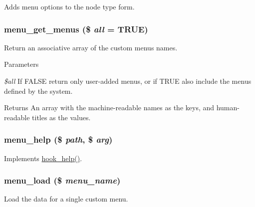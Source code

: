 Adds menu options to the node type form. \hypertarget{menu_8module_a25bb9c595512dd1485c988e268407845}{
\subsubsection[{menu\_\-get\_\-menus}]{\setlength{\rightskip}{0pt plus 5cm}menu\_\-get\_\-menus (\$ {\em all} = {\ttfamily TRUE})}}
\label{menu_8module_a25bb9c595512dd1485c988e268407845}
Return an associative array of the custom menus names.


\begin{DoxyParams}{Parameters}
\item[{\em \$all}]If FALSE return only user-\/added menus, or if TRUE also include the menus defined by the system. \end{DoxyParams}
\begin{DoxyReturn}{Returns}
An array with the machine-\/readable names as the keys, and human-\/readable titles as the values. 
\end{DoxyReturn}
\hypertarget{menu_8module_a5a8f5faa611ccce11d6549e1948e145e}{
\subsubsection[{menu\_\-help}]{\setlength{\rightskip}{0pt plus 5cm}menu\_\-help (\$ {\em path}, \/  \$ {\em arg})}}
\label{menu_8module_a5a8f5faa611ccce11d6549e1948e145e}
Implements \hyperlink{group__hooks_ga5589c2714a782738e8851c4c90231f0e}{hook\_\-help()}. \hypertarget{menu_8module_afa91fb0278c163a85e7a0913d7fedb3b}{
\subsubsection[{menu\_\-load}]{\setlength{\rightskip}{0pt plus 5cm}menu\_\-load (\$ {\em menu\_\-name})}}
\label{menu_8module_afa91fb0278c163a85e7a0913d7fedb3b}
Load the data for a single custom menu.



